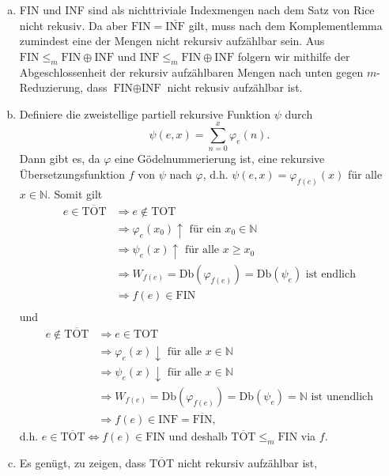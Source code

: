 \documentclass[german,headsepline]{scrartcl}
\theoremstyle{definition}
\begin{document}
	\begin{solution}
		\begin{enumerate}[(a)]
			\item FIN und INF sind als nichttriviale Indexmengen nach dem Satz von Rice nicht rekusiv.
				Da aber $\text{FIN}=\overline{\text{INF}}$ gilt,
				muss nach dem Komplementlemma zumindest eine der Mengen nicht rekursiv aufzählbar sein.
				Aus $\text{FIN}\leq_m\text{FIN}\oplus\text{INF}$ und $\text{INF}\leq_m\text{FIN}\oplus\text{INF}$
				folgern wir mithilfe der Abgeschlossenheit der rekursiv aufzählbaren Mengen nach unten gegen $m$-Reduzierung,
				dass $\text{FIN}\oplus\text{INF}$ nicht rekusiv aufzählbar ist.
			\item Definiere die zweistellige partiell rekursive Funktion $\psi$ durch
				\[\psi(e,x)=\sum_{n=0}^{x}\varphi_e(n).\]
				Dann gibt es, da $\varphi$ eine Gödelnummerierung ist,
				eine rekursive Übersetzungsfunktion $f$ von $\psi$ nach $\varphi$,
				d.h. $\psi(e,x)=\varphi_{f(e)}(x)$ für alle $x\in\mathbb{N}$.
				Somit gilt \begin{align*}
					e\in\overline{\text{TOT}}
					&\Rightarrow e\not\in\text{TOT} \\
					&\Rightarrow\varphi_e(x_0)\uparrow\text{ für ein }x_0\in\mathbb{N} \\
					&\Rightarrow\psi_e(x)\uparrow\text{ für alle }x\geq x_0 \\
					&\Rightarrow W_{f(e)}=\text{Db}(\varphi_{f(e)})=\text{Db}(\psi_e)\text{ ist endlich} \\
					&\Rightarrow f(e)\in\text{FIN} \\
				\end{align*} und \begin{align*}
					e\not\in\overline{\text{TOT}}
					&\Rightarrow e\in\text{TOT} \\
					&\Rightarrow\varphi_e(x)\downarrow\text{ für alle }x\in\mathbb{N} \\
					&\Rightarrow\psi_e(x)\downarrow\text{ für alle }x\in\mathbb{N} \\
					&\Rightarrow W_{f(e)}=\text{Db}(\varphi_{f(e)})=\text{Db}(\psi_e)=\mathbb{N} \text{ ist unendlich} \\
					&\Rightarrow f(e)\in\text{INF}=\overline{\text{FIN}},
				\end{align*}
				d.h. $e\in\overline{\text{TOT}}\Leftrightarrow f(e)\in\text{FIN}$
				und deshalb $\overline{\text{TOT}}\leq_m\text{FIN}$ via $f$.
			\item Es genügt, zu zeigen, dass $\overline{\text{TOT}}$ nicht rekursiv aufzählbar ist,

\end{enumerate}
\end{solution}
\end{document}
